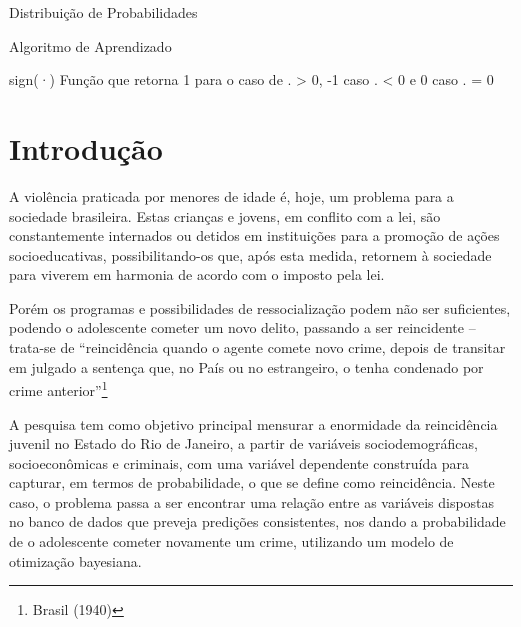 \documentclass[
	12pt,				%
	a4paper,		%
	oneside,    %
	chapter=TITLE,		   %
	section=TITLE,		   %
	subsection=TITLE,	   %
	subsubsection=TITLE, %
	english,			%
	french,				%
	spanish,			%
	brazil,				%
]{abntex2}
\begin{document}
\listoftables*
\clearpage

\begin{siglas}
  \item[\mathcal{D}] Distribuição de Probabilidades
  \item[\xi] Algoritmo de Aprendizado
  \item[sign(·)] Função que retorna 1 para o caso de . > 0, -1 caso . < 0 e 0 caso . = 0
\end{siglas}


\tableofcontents*
\clearpage

\textual

\hypertarget{introduuxe7uxe3o}{%
\chapter{Introdução}\label{introduuxe7uxe3o}}

A violência praticada por menores de idade é, hoje, um problema para a
sociedade brasileira. Estas crianças e jovens, em conflito com a lei,
são constantemente internados ou detidos em instituições para a promoção
de ações socioeducativas, possibilitando-os que, após esta medida,
retornem à sociedade para viverem em harmonia de acordo com o imposto
pela lei.

Porém os programas e possibilidades de ressocialização podem não ser
suficientes, podendo o adolescente cometer um novo delito, passando a
ser reincidente -- trata-se de ``reincidência quando o agente comete
novo crime, depois de transitar em julgado a sentença que, no País ou no
estrangeiro, o tenha condenado por crime anterior''\footnote{Brasil
  (1940)}

A pesquisa tem como objetivo principal mensurar a enormidade da
reincidência juvenil no Estado do Rio de Janeiro, a partir de variáveis
sociodemográficas, socioeconômicas e criminais, com uma variável
dependente construída para capturar, em termos de probabilidade, o que
se define como reincidência. Neste caso, o problema passa a ser
encontrar uma relação entre as variáveis dispostas no banco de dados que
preveja predições consistentes, nos dando a probabilidade de o
adolescente cometer novamente um crime, utilizando um modelo de
otimização bayesiana.
\end{document}
